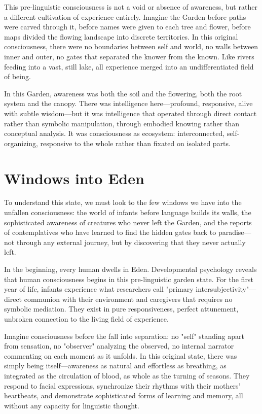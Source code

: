 This pre-linguistic consciousness is not a void or absence of awareness, but rather a different cultivation of experience entirely. Imagine the Garden before paths were carved through it, before names were given to each tree and flower, before maps divided the flowing landscape into discrete territories. In this original consciousness, there were no boundaries between self and world, no walls between inner and outer, no gates that separated the knower from the known. Like rivers feeding into a vast, still lake, all experience merged into an undifferentiated field of being.

In this Garden, awareness was both the soil and the flowering, both the root system and the canopy. There was intelligence here—profound, responsive, alive with subtle wisdom—but it was intelligence that operated through direct contact rather than symbolic manipulation, through embodied knowing rather than conceptual analysis. It was consciousness as ecosystem: interconnected, self-organizing, responsive to the whole rather than fixated on isolated parts.

\section{Windows into Eden}

To understand this state, we must look to the few windows we have into the unfallen consciousness: the world of infants before language builds its walls, the sophisticated awareness of creatures who never left the Garden, and the reports of contemplatives who have learned to find the hidden gates back to paradise—not through any external journey, but by discovering that they never actually left.

In the beginning, every human dwells in Eden. Developmental psychology reveals that human consciousness begins in this pre-linguistic garden state. For the first year of life, infants experience what researchers call "primary intersubjectivity"—direct communion with their environment and caregivers that requires no symbolic mediation. They exist in pure responsiveness, perfect attunement, unbroken connection to the living field of experience.

Imagine consciousness before the fall into separation: no "self" standing apart from sensation, no "observer" analyzing the observed, no internal narrator commenting on each moment as it unfolds. In this original state, there was simply being itself—awareness as natural and effortless as breathing, as integrated as the circulation of blood, as whole as the turning of seasons. They respond to facial expressions, synchronize their rhythms with their mothers' heartbeats, and demonstrate sophisticated forms of learning and memory, all without any capacity for linguistic thought.

